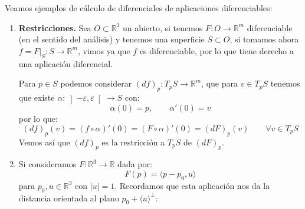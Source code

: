 \begin{ejemplo}
    Veamos ejemplos de cálculo de diferenciales de aplicaciones diferenciables:
    \begin{enumerate}
        \item \textbf{Restricciones.} Sea $O\subset \mathbb{R}^3$ un abierto, si tenemos $F:O\to \mathbb{R}^m$ diferenciable (en el sentido del análisis) y tenemos una superficie $S\subset O$, si tomamos ahora $f=F\big|_S:S\to \mathbb{R}^m$, vimos ya que $f$ es diferenciable, por lo que tiene derecho a una aplicación diferencial.

            Para $p\in S$ podemos considerar $(d f)_p:T_pS\to \mathbb{R}^m$, que para $v\in T_pS$ tenemos que existe $\alpha:\left]-\varepsilon,\varepsilon\right[\to S$ con:
            \begin{equation*}
                \alpha(0) = p, \qquad \alpha'(0) = v
            \end{equation*}
            por lo que:
            \begin{equation*}
                (d f)_p(v) = (f\circ \alpha)'(0) = (F\circ \alpha)'(0) = (dF)_p(v) \qquad \forall v\in T_pS
            \end{equation*}
            Vemos así que $(d f)_p$ es la restricción a $T_pS$ de $(dF)_p$.
        \item[1a.] Si consideramos $F:\mathbb{R}^3\to \mathbb{R}$ dada por:
            \begin{equation*}
                F(p) = \langle p-p_0,u \rangle 
            \end{equation*}
            para $p_0,u\in \mathbb{R}^3$ con $|u| = 1$. Recordamos que esta aplicación nos da la distancia orientada al plano $p_0 + \langle u \rangle^\perp $:


\end{enumerate}
\end{ejemplo}
